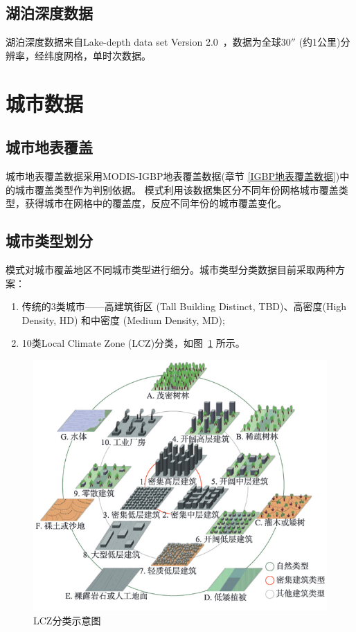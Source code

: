 \subsection{湖泊深度数据}
湖泊深度数据来自Lake-depth data set Version 2.0~\citep{kourzeneva2012global}，数据为全球$30''$ (约1公里)分辨率，经纬度网格，单时次数据。

\section{城市数据}\label{城市数据}

\subsection{城市地表覆盖}\label{城市地表覆盖}
城市地表覆盖数据采用MODIS-IGBP地表覆盖数据(章节 \ref{IGBP地表覆盖数据})中的城市覆盖类型作为判别依据。
模式利用该数据集区分不同年份网格城市覆盖类型，获得城市在网格中的覆盖度，反应不同年份的城市覆盖变化。

\subsection{城市类型划分}\label{城市类型划分}
模式对城市覆盖地区不同城市类型进行细分。城市类型分类数据目前采取两种方案：
\begin{enumerate}
    \item 传统的3类城市——高建筑街区 (Tall Building Distinct, TBD)、高密度(High Density, HD) 和中密度 (Medium Density, MD);
    \item 10类Local Climate Zone (LCZ)分类，如图~\ref{fig:LCZ分类图示}  所示。
\end{enumerate}
{
\begin{figure}[]
\centering
\includegraphics{Figures/地表输入数据/LCZ分类图示.png}
\caption{LCZ分类示意图}
\label{fig:LCZ分类图示}
\end{figure}
}


